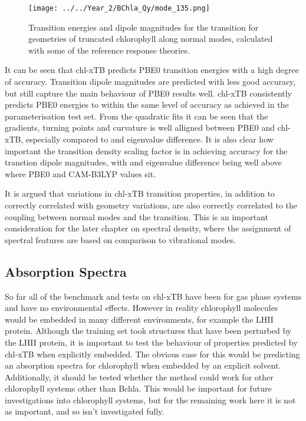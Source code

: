 \begin{figure}
    \centering
    \texttt{[image: ../../Year\_2/BChla\_Qy/mode\_135.png]}
    \label{fig:mode_135}
    \caption{Transition energies and dipole magnitudes for the \Qy transition for
    geometries of truncated chlorophyll along normal modes, calculated with some 
    of the reference response theories.}
\end{figure}

It can be seen that chl-xTB predicts PBE0 transition energies with a high degree
of accuracy. Transition dipole magnitudes are predicted with less good accuracy,
but still capture the main behaviour of PBE0 results well. chl-xTB consistently 
predicts PBE0 energies to within the same level of accuracy as achieved in the 
parameterisation test set. From the quadratic fits it can be seen that the gradients, 
turning points and curvature is well alligned between PBE0 and chl-xTB, especially
compared to \dscf and eigenvalue difference. It is also clear how important the
transition density scaling factor is in achieving accuracy for the transtion dipole
magnitudes, with \dscf and eigenvalue difference being well above where PBE0 and
CAM-B3LYP values sit.

It is argued that variations in chl-xTB transition properties, in addition to correctly
correlated with geometry variations, are also correctly correlated to the coupling
between normal modes and the \Qy transition. This is an important consideration 
for the later chapter on spectral density, where the assignment of spectral features
are based on comparison to vibrational modes.

\afterpartskip
\subsection{Absorption Spectra}
\label{subsec:absorption_spectra}

So far all of the benchmark and tests on chl-xTB have been for gas phase systems
and have no environmental effects. However in reality chlorophyll molecules would
be embedded in many different environments, for example the LHII protein. Although
the training set took structures that have been perturbed by the LHII protein, it
is important to test the behaviour of properties predicted by chl-xTB when explicitly
embedded. The obvious case for this would be predicting an absorption spectra for
chlorophyll when embedded by an explicit solvent. Additionally, it should be tested
whether the method could work for other chlorophyll systems other than Bchla. This
would be important for future investigations into chlorophyll systems, but for the
remaining work here it is not as important, and so isn't investigated fully.

